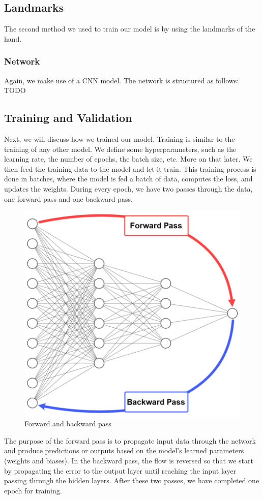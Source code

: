 \documentclass[../paper.tex]{subfiles}
\begin{document}
    \subsection{Landmarks}
    The second method we used to train our model is by using the landmarks of the hand.
    \subsubsection{Network}
    Again, we make use of a CNN model.
    The network is structured as follows:\\
    TODO

    \subsection{Training and Validation}
    Next, we will discuss how we trained our model.
    Training is similar to the training of any other model.
    We define some hyperparameters, such as the learning rate, the number of epochs, the batch size, etc.
    More on that later.
    We then feed the training data to the model and let it train.
    This training process is done in batches, where the model is fed a batch of data, computes the loss, and updates the weights.
    During every epoch, we have two passes through the data, one forward pass and one backward pass. 
    \begin{figure}[h]
        \centering
        \includegraphics[width=\linewidth]{Backpropagation-passes-architecture}
        \caption{Forward and backward pass}
        \label{fig:forward_backward_pass}
    \end{figure}
    The purpose of the forward pass is to propagate input data through the network and produce predictions or outputs based on the model's learned parameters (weights and biases).\cite{o13}
    In the backward pass, the flow is reversed so that we start by propagating the error to the output layer until reaching the input layer passing through the hidden layers.\cite{o14}
    After these two passes, we have completed one epoch for training.
\end{document}
